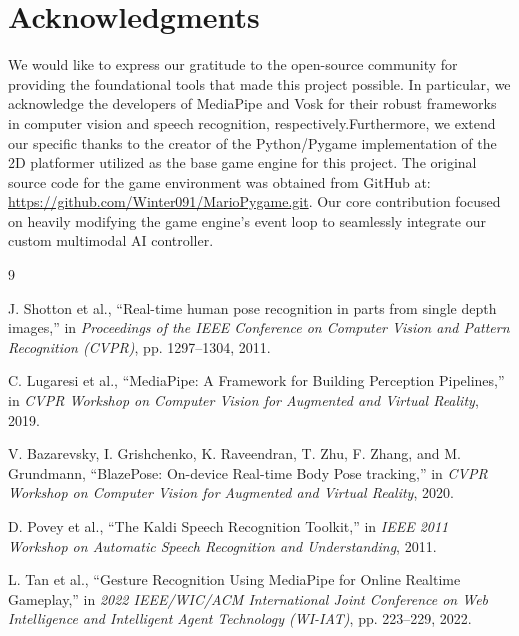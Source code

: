 \documentclass[10pt,twocolumn,a4paper]{article}
\begin{document}
	
	\section*{Acknowledgments}
	
    We would like to express our gratitude to the open-source community for providing the foundational tools that made this project possible. In particular, we acknowledge the developers of MediaPipe and Vosk for their robust frameworks in computer vision and speech recognition, respectively.Furthermore, we extend our specific thanks to the creator of the Python/Pygame implementation of the 2D platformer utilized as the base game engine for this project. The original source code for the game environment was obtained from GitHub at: \url{https://github.com/Winter091/MarioPygame.git}. Our core contribution focused on heavily modifying the game engine's event loop to seamlessly integrate our custom multimodal AI controller.

	
	\begin{thebibliography}{9}

      J. Shotton et al.,
      ``Real-time human pose recognition in parts from single depth images,''
      in \textit{Proceedings of the IEEE Conference on Computer Vision and Pattern Recognition (CVPR)}, pp. 1297--1304, 2011.
    
      C. Lugaresi et al.,
      ``MediaPipe: A Framework for Building Perception Pipelines,''
      in \textit{CVPR Workshop on Computer Vision for Augmented and Virtual Reality}, 2019.
    
      V. Bazarevsky, I. Grishchenko, K. Raveendran, T. Zhu, F. Zhang, and M. Grundmann,
      ``BlazePose: On-device Real-time Body Pose tracking,''
      in \textit{CVPR Workshop on Computer Vision for Augmented and Virtual Reality}, 2020.
    
      D. Povey et al.,
      ``The Kaldi Speech Recognition Toolkit,''
      in \textit{IEEE 2011 Workshop on Automatic Speech Recognition and Understanding}, 2011.
    
      L. Tan et al.,
      ``Gesture Recognition Using MediaPipe for Online Realtime Gameplay,''
      in \textit{2022 IEEE/WIC/ACM International Joint Conference on Web Intelligence and Intelligent Agent Technology (WI-IAT)}, pp. 223--229, 2022.
    
    \end{thebibliography}
    
	
\end{document}
